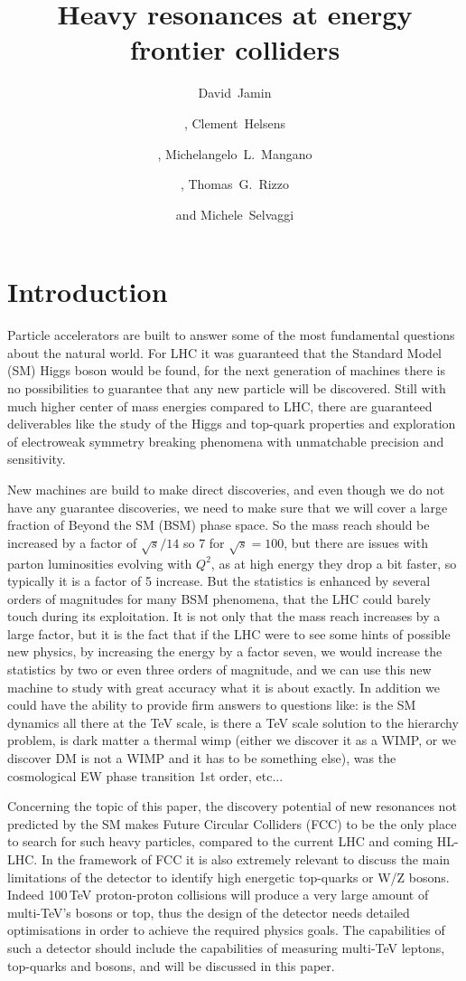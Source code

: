 \documentclass[a4paper,11pt]{article}
\title{\boldmath Heavy resonances at energy frontier colliders}
\author[a,c]{David~Jamin}
\author[a]{\!\!, Clement~Helsens}
\author[a]{\!\!, Michelangelo~L.~Mangano}
\author[b]{\!\!, Thomas~G.~Rizzo}
\author[a]{and Michele~Selvaggi}
\affiliation[a]{CERN, CH-1211 Geneva 23, Switzerland}
\affiliation[b]{SLAC National Accelerator Laboratory 2575 Sand Hill Rd., Menlo Park, CA, 94025 USA}
\affiliation[c]{Academia Sinica, Institute of  Physics, Taipei, Taiwan}
\begin{document}
\maketitle
\flushbottom

\section{Introduction}
\label{sec:intro}
Particle accelerators are built to answer some of the most fundamental questions about the natural world. For LHC it was guaranteed that the Standard Model (SM) Higgs boson would be found, for the next generation of machines there is no possibilities to guarantee that any new particle will be discovered. Still with much higher center of mass energies compared to LHC, there are guaranteed deliverables like the study of the Higgs and top-quark properties and exploration of electroweak symmetry breaking phenomena with unmatchable precision and sensitivity.

New machines are build to make direct discoveries, and even though we do not have any guarantee discoveries, we need to make sure that we will cover a large fraction of Beyond the SM (BSM) phase space. So the mass reach should be increased by a factor of $\sqrt{s}/14$ so 7 for $\sqrt{s}=100$, but there are issues with parton luminosities evolving with $Q^2$, as at high energy they drop a bit faster, so typically it is a factor of 5 increase. But the statistics is enhanced by several orders of magnitudes for many BSM phenomena, that the LHC could barely touch during its exploitation. It is not only that the mass reach increases by a large factor, but it is the fact that if the LHC were to see some hints of possible new physics, by increasing the energy by a factor seven, we would increase the statistics by two or even three orders of magnitude, and we can use this new machine to study with great accuracy what it is about exactly.
In addition we could have the ability to provide firm answers to questions like: is the SM dynamics all there at the TeV scale, is there a TeV scale solution to the hierarchy problem, is dark matter a thermal wimp (either we discover it as a WIMP, or we discover DM is not a WIMP and it has to be something else), was the cosmological EW phase transition 1st order, etc...

Concerning the topic of this paper, the discovery potential of new resonances not predicted by the SM makes Future Circular Colliders (FCC) to be the only  place to search for such heavy particles, compared to the current LHC and coming HL-LHC.
In the framework of FCC it is also extremely relevant to discuss the main limitations of the detector to identify high energetic top-quarks or W/Z bosons. Indeed 100\,TeV proton-proton collisions will produce a very large amount of multi-TeV's bosons or top, thus the design of the detector needs detailed optimisations in order to achieve the required physics goals. The capabilities of such a detector should include the capabilities of measuring multi-TeV leptons, top-quarks and bosons, and will be discussed in this paper.
\end{document}
